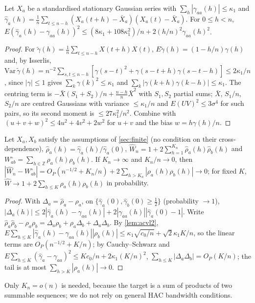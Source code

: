 \begin{lemma}\label{lem:acvl2}
Let $X_a$ be a standardised stationary Gaussian series with $\sum_h|\gamma_{aa}(h)|\le\kappa_1$ and
$\hat\gamma_a(h)=\frac1n\sum_{t\le n-h}(X_a(t{+}h)-\bar X_a)(X_a(t)-\bar X_a)$. For $0\le h<n$,
$E(\hat\gamma_a(h)-\gamma_{aa}(h))^2\le(8\kappa_1+108\kappa_1^2)/n+2(h/n)^2\gamma_{aa}(h)^2$.
\end{lemma}
\begin{proof}
For $\tilde\gamma(h)=\frac1n\sum_{t\le n-h}X(t{+}h)X(t)$, $E\tilde\gamma(h)=(1-h/n)\gamma(h)$ and, by Isserlis,
$\mathrm{Var}\,\tilde\gamma(h)=n^{-2}\sum_{s,t\le n-h}[\gamma(s{-}t)^2+\gamma(s{-}t{+}h)\gamma(s{-}t{-}h)]\le2\kappa_1/n$,
since $|\gamma|\le1$ gives $\sum_k\gamma(k)^2\le\kappa_1$ and $\sum_k|\gamma(k{+}h)\gamma(k{-}h)|\le\kappa_1$. The
centring term is $-\bar X(S_1+S_2)/n+\frac{n-h}{n}\bar X^2$ with $S_1,S_2$ partial sums; $\bar X$, $S_1/n$, $S_2/n$ are
centred Gaussians with variance $\le\kappa_1/n$ and $E(UV)^2\le3\sigma^4$ for such pairs, so its second moment is
$\le27\kappa_1^2/n^2$. Combine with $(u+v+w)^2\le4u^2+4v^2+2w^2$ for $u+v$ and the bias $w=h\gamma(h)/n$.
\end{proof}

\begin{lemma}\label{lem:plugin}
Let $X_a,X_b$ satisfy the assumptions of \cref{sec:finite} (no condition on their cross-dependence),
$\hat\rho_a(h)=\hat\gamma_a(h)/\hat\gamma_a(0)$, $\hat W_n=1+2\sum_{h=1}^{K_n}\hat\rho_a(h)\hat\rho_b(h)$ and
$W^\circ_{ab}=\sum_{h\in\mathbb Z}\rho_a(h)\rho_b(h)$. If $K_n\to\infty$ and $K_n/n\to0$, then
$|\hat W_n-W^\circ_{ab}|=O_P(n^{-1/2}+K_n/n)+2\sum_{h>K_n}|\rho_a(h)\rho_b(h)|\to0$; for fixed $K$,
$\hat W\to1+2\sum_{h\le K}\rho_a(h)\rho_b(h)$ in probability.
\end{lemma}
\begin{proof}
With $\Delta_a=\hat\rho_a-\rho_a$, on $\{\hat\gamma_a(0),\hat\gamma_b(0)\ge\frac12\}$ (probability $\to1$),
$|\Delta_a(h)|\le2|\hat\gamma_a(h)-\gamma_{aa}(h)|+2|\gamma_{aa}(h)||\hat\gamma_a(0)-1|$. Write
$\hat\rho_a\hat\rho_b-\rho_a\rho_b=\Delta_a\rho_b+\rho_a\Delta_b+\Delta_a\Delta_b$. By \cref{lem:acvl2},
$E\sum_{h\le K}|\hat\gamma_a(h)-\gamma_{aa}(h)||\rho_b(h)|\le\kappa_1\sqrt{c_0/n}+\sqrt2\kappa_1K/n$, so the linear terms
are $O_P(n^{-1/2}+K/n)$; by Cauchy--Schwarz and $E\sum_{h\le K}(\hat\gamma_a-\gamma_{aa})^2\le Kc_0/n+2\kappa_1(K/n)^2$,
$\sum_{h\le K}|\Delta_a\Delta_b|=O_P(K/n)$; the tail is at most $\sum_{h>K}|\rho_a(h)|\to0$.
\end{proof}
Only $K_n=o(n)$ is needed, because the target is a sum of products of two summable sequences; we do not rely on
general HAC bandwidth conditions.

